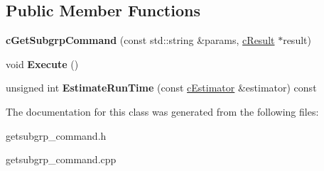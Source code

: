 \subsection*{\-Public \-Member \-Functions}
\begin{DoxyCompactItemize}
\item 
\hypertarget{classengine_1_1cGetSubgrpCommand_a6a8ed3563fa6abbcda749590fcf0b3a5}{
{\bfseries c\-Get\-Subgrp\-Command} (const std\-::string \&params, \hyperlink{classengine_1_1cResult}{c\-Result} $\ast$result)}
\label{classengine_1_1cGetSubgrpCommand_a6a8ed3563fa6abbcda749590fcf0b3a5}

\item 
\hypertarget{classengine_1_1cGetSubgrpCommand_a2ffef92bfb565ba5bd6625b654b8b62f}{
void {\bfseries \-Execute} ()}
\label{classengine_1_1cGetSubgrpCommand_a2ffef92bfb565ba5bd6625b654b8b62f}

\item 
\hypertarget{classengine_1_1cGetSubgrpCommand_a573686cc345423ab0e4fbc94b81c9521}{
unsigned int {\bfseries \-Estimate\-Run\-Time} (const \hyperlink{classengine_1_1cEstimator}{c\-Estimator} \&estimator) const }
\label{classengine_1_1cGetSubgrpCommand_a573686cc345423ab0e4fbc94b81c9521}

\end{DoxyCompactItemize}


\-The documentation for this class was generated from the following files\-:\begin{DoxyCompactItemize}
\item 
getsubgrp\-\_\-command.\-h\item 
getsubgrp\-\_\-command.\-cpp\end{DoxyCompactItemize}
